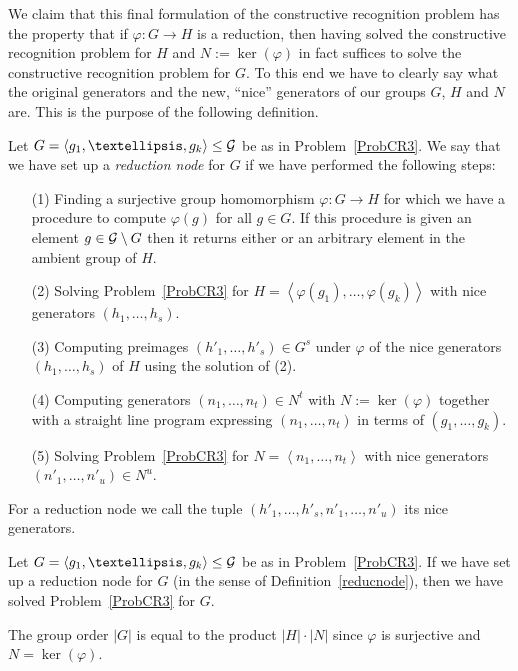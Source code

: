 We claim that this final formulation of the constructive recognition
problem has the property that if $\varphi : G \to H$ is a reduction, then
having solved the constructive recognition problem for $H$ and $N :=
\ker(\varphi)$ in fact suffices to solve the constructive recognition
problem for $G$. To this end we have to
clearly say what the original generators and the new, ``nice'' generators
of our groups $G$, $H$ and $N$ are. This is the purpose of the following
definition.

\begin{Def}
\label{reducnode}
%
Let $G = \left< g_1, \ldots, g_k \right> \le \GG$ be as in 
Problem~\ref{ProbCR3}.
We say that we have set up a \emph{reduction node} for $G$ if we have
performed the following steps:
\begin{itemize}
\item[(1)] Finding a surjective group homomorphism $\varphi : G \to H$ for
which we have a procedure to compute $\varphi(g)$ for all $g \in G$.
If this procedure is given an element $g \in \mathcal{G} \setminus G$ then it
returns either {\fail} or an arbitrary element in the ambient group of $H$.
\item[(2)] Solving Problem~\ref{ProbCR3} for $H = \left< \varphi(g_1),
\ldots, \varphi(g_k) \right>$ with nice generators $(h_1, \ldots, h_s)$.
\item[(3)] Computing preimages $(h'_1, \ldots, h'_s) \in G^s$ under $\varphi$
of the nice generators $(h_1, \ldots, h_s)$ of $H$ using the solution
of (2).
%
\item[(4)] Computing generators $(n_1, \ldots, n_t) \in N^t$ with $N :=
\ker(\varphi)$ together with a straight line program expressing
$(n_1, \ldots, n_t)$ in terms of $(g_1, \ldots, g_k)$.
%
\item[(5)] Solving Problem~\ref{ProbCR3} for $N = \left< n_1, \ldots, n_t
\right>$ with nice generators $(n'_1, \ldots, n'_u) \in N^u$.
\end{itemize}
For a reduction node we call the tuple $(h'_1, \ldots, h'_s, n'_1, \ldots,
n'_u)$ its nice generators.
\end{Def}

\begin{Prop}
Let $G = \left< g_1, \ldots, g_k \right> \le \GG$ be as in 
Problem~\ref{ProbCR3}.
If we have set up a reduction node for $G$ (in the sense of
Definition~\ref{reducnode}), then we have solved
Problem~\ref{ProbCR3} for $G$.
\end{Prop}
\proofbeg
The group order $|G|$ is equal to the product $|H| \cdot |N|$ since
$\varphi$ is surjective and $N = \ker(\varphi)$.

